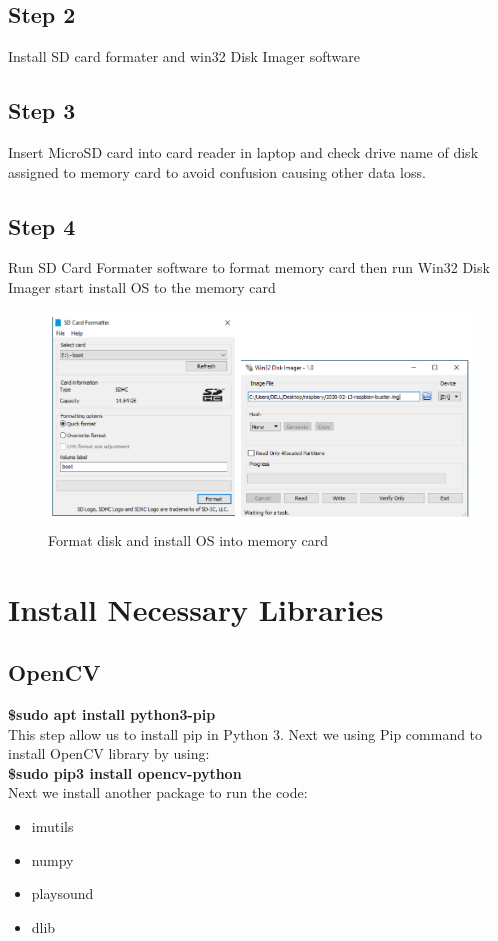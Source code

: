     \subsection{Step 2}
        Install SD card formater and win32 Disk Imager software
    \subsection{Step 3}
        Insert MicroSD card into card reader in laptop and check drive name of disk assigned to memory card to avoid 
        confusion causing other data loss. 
    \subsection{Step 4}
        Run SD Card Formater software to format memory card then run Win32 Disk Imager start install OS to the memory card
        \begin{figure}[H]
            \centering
            \includegraphics[width=0.8\linewidth]{img/format-disk.PNG}
            \caption{Format disk and install OS into memory card}
        \end{figure}
\section{Install Necessary Libraries}
    \subsection{OpenCV}
        \textbf{\$sudo apt install python3-pip} \\ 
        \vspace{3mm}
        This step allow us to install pip in Python 3. Next we using Pip command to install OpenCV library by using: \\ 
        \vspace{3mm}
        \textbf{\$sudo pip3 install opencv-python} \\ 
        \vspace{3mm}
        Next we install another package to run the code: 
        \begin{itemize}
            \item imutils
            \item numpy
            \item playsound 
            \item dlib
        \end{itemize}
